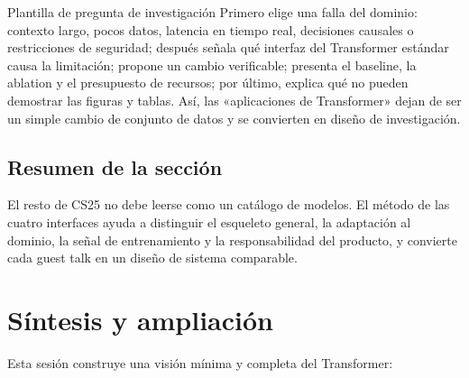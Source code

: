 \documentclass[a4paper]{article}
\begin{document}
\begin{knowledgebox}{Plantilla de pregunta de investigación}
Primero elige una falla del dominio: contexto largo, pocos datos, latencia en tiempo real, decisiones causales o restricciones de seguridad; después señala qué interfaz del Transformer estándar causa la limitación; propone un cambio verificable; presenta el baseline, la ablation y el presupuesto de recursos; por último, explica qué no pueden demostrar las figuras y tablas. Así, las «aplicaciones de Transformer» dejan de ser un simple cambio de conjunto de datos y se convierten en diseño de investigación.
\end{knowledgebox}

\subsection{Resumen de la sección}

El resto de CS25 no debe leerse como un catálogo de modelos. El método de las cuatro interfaces ayuda a distinguir el esqueleto general, la adaptación al dominio, la señal de entrenamiento y la responsabilidad del producto, y convierte cada guest talk en un diseño de sistema comparable.
\section{Síntesis y ampliación}

Esta sesión construye una visión mínima y completa del Transformer:
\end{document}
